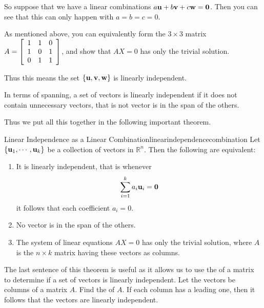 \begin{solution}
So suppose that we have a linear combinations $a{\bf u} + b {\bf v}
+ c{\bf w} = {\bf 0}$. Then you can see that this can only happen
with $a=b=c=0$.

As mentioned above, you can equivalently form the $3 \times 3$ matrix $A = 
\left[ 
\begin{array}{ccc}
1  & 1 & 0 \\
1  & 0 & 1 \\
0  & 1 & 1 \\
\end{array}
\right]$, and show that $AX=0$ has only the trivial solution.

Thus this  means the set $\left\{ {\bf u}, {\bf v}, {\bf w} \right\}$ is linearly independent. 
\end{solution}

In terms of spanning, a set of vectors is linearly independent if it
does not contain unnecessary vectors, that is not vector is in the span of the others.

Thus we put all this together in the following important theorem.

\begin{theorem}{Linear Independence as a Linear Combination}{linearindependencecombination}
Let $\left\{{\bf u}_{1},\cdots ,{\bf u}_{k}\right\}$ be a collection of vectors  in
$\mathbb{R}^{n}$. Then the following are equivalent:

\begin{enumerate}
\item It is linearly independent, that is whenever
\begin{equation*}
\sum_{i=1}^{k}a_{i}{\bf u}_{i}={\bf 0}
\end{equation*}
it follows that each coefficient $a_{i}=0$.
\item No vector is in the span of the others.
\item The system of
linear equations $AX=0$ has only the trivial solution, where $A$ is
the $n \times k$ matrix having these vectors as columns. 
\end{enumerate}
\end{theorem}

The last sentence of this theorem is useful as it allows us to use the
{\rref} of a matrix to determine if a set of vectors is linearly
independent. Let the vectors be columns of a matrix $A$. Find the
{\rref} of $A$. If each column has a leading one, then it follows
that the vectors are linearly independent.

